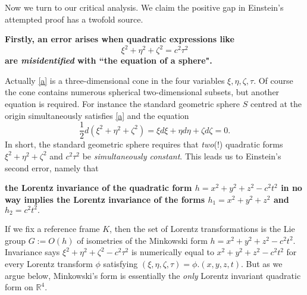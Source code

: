 \documentclass[12pt]{amsart}
\theoremstyle{definition}
\theoremstyle{remark}
\newcommand{\bR}{\mathbb{R}}
\newcommand{\del}{\partial}
\begin{document}





Now we turn to our critical analysis. We claim the positive gap in Einstein's attempted proof has a twofold source. 

\textbf{ Firstly, an error arises when quadratic expressions like \begin{equation}\label{a}\xi^2+\eta^2+\zeta^2=c^2 \tau^2
\end{equation} are \emph{misidentified} with ``the equation of a sphere".}

Actually \eqref{a} is a three-dimensional cone in the four variables $\xi, \eta, \zeta, \tau$. Of course the cone contains numerous spherical two-dimensional subsets, but another equation is required. For instance the standard geometric sphere $S$ centred at the origin simultaneously satisfies \eqref{a} and the equation $$\frac{1}{2}d(\xi^2+\eta^2+\zeta^2)=\xi d\xi+\eta d\eta +\zeta d\zeta=0.$$ In short, the standard geometric sphere requires that \emph{two}(!) quadratic forms $\xi^2+\eta^2+\zeta^2$ and $c^2\tau^2$ be \emph{simultaneously constant}. This leads us to Einstein's second error, namely that
 
  \textbf{ the Lorentz invariance of the quadratic form $h=x^2+y^2+z^2-c^2t^2$ in no way implies the Lorentz invariance of the forms $h_1=x^2+y^2+z^2$ and $h_2=c^2 t^2.$ }



If we fix a reference frame $K$, then the set of Lorentz transformations is the Lie group $G:=O(h)$ of isometries of the Minkowski form $h=x^2+y^2+z^2-c^2t^2$. Invariance says $\xi^2+\eta^2+\zeta^2-c^2 \tau^2$ is numerically equal to $x^2+y^2+z^2-c^2 t^2$ for every Lorentz transform $\phi$ satisfying $(\xi, \eta, \zeta, \tau)=\phi.(x,y,z,t)$. But as we argue below, Minkowski's form is essentially the \emph{only} Lorentz invariant quadratic form on $\bR^4$. 
\end{document}
